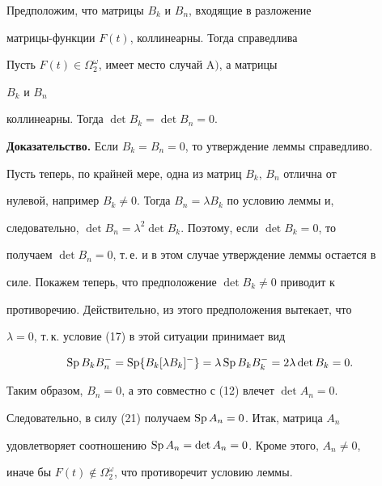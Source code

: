  


Предположим, что матрицы $B_k$ и $B_n$, входящие в разложение 


матрицы-функции $F(t)$, коллинеарны. Тогда справедлива 


 


 


\begin{lem} 


Пусть $F(t)\in\Omega^\omega_2$, имеет место случай $\mathrm A)$, а матрицы 


$B_k$ и $B_n$ 


коллинеарны. Тогда $\det B_k=\det B_n=0$. 


\end{lem} 


 


 


{\bf Доказательство.} Если $B_k=B_n=0$, то утверждение леммы справедливо. 


Пусть теперь, по крайней мере, одна из матриц $B_k$, $B_n$ отлична от 


нулевой, например $B_k\ne0$. Тогда $B_n=\lambda B_k$ по условию леммы и, 


следовательно, $\det B_n=\lambda^2\det B_k$. Поэтому, если $\det B_k=0$, то 


получаем $\det B_n=0$, т.\,е. и в этом случае утверждение леммы остается в 


силе. Покажем теперь, что предположение $\det B_k\ne0$ приводит к 


противоречию. Действительно, из этого предположения вытекает, что 


$\lambda=0$, т.\,к. условие (17) в этой ситуации принимает вид 


$$ 


\Sp B_k B^-_n=\Sp\{B_k[\lambda B_k]^-\}= 


\lambda\Sp B_k B^-_k=2\lambda\det B_k=0. 


$$ 


 


Таким образом, $B_n=0$, а это совместно с (12) влечет $\det A_n=0$. 


Следовательно, в силу (21) получаем $\operatorname{Sp} A_n=0$. Итак, матрица $A_n$ 


удовлетворяет соотношению $\operatorname{Sp} A_n=\det A_n=0$. Кроме этого, $A_n\ne0$, 


иначе бы $F(t)\notin\Omega^\omega_2$, что противоречит условию леммы. 


